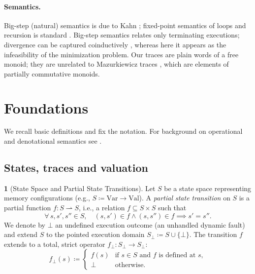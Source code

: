 \documentclass[oneside,english]{amsart}
\numberwithin{equation}{section}
\numberwithin{figure}{section}
\theoremstyle{plain}
\theoremstyle{definition}
\newtheorem{defn}[thm]{\protect\definitionname}
\theoremstyle{plain}
\theoremstyle{remark}
\theoremstyle{plain}
\theoremstyle{definition}
\theoremstyle{plain}
\theoremstyle{remark}
\providecommand{\definitionname}{Definition}
\begin{document}
\paragraph{Semantics.}
Big-step (natural) semantics is due to Kahn \cite{kahn1987natural}; fixed-point semantics of loops and recursion is
standard \cite{manna1974mathematical,winskel1993formal}. Big-step semantics relates only terminating executions; divergence
can be captured coinductively \cite{leroy2009coinductive}, whereas here it appears as the infeasibility of the
minimization problem. Our traces are plain words of a free monoid; they are unrelated to Mazurkiewicz traces
\cite{diekert1995traces}, which are elements of partially commutative monoids.

\section{Foundations}
\label{sec:foundations}

We recall basic definitions and fix the notation. For background on operational and
denotational semantics see \cite{winskel1993formal}.

\subsection{States, traces and valuation}

\begin{defn}[State Space and Partial State Transitions]
\label{def:state-transition}
Let $S$ be a state space representing memory configurations (e.g., $S \coloneqq \text{Var} \to \text{Val}$). A \textit{partial state transition} on $S$ is a partial function $f : S \rightharpoonup S$, i.e., a relation $f \subseteq S \times S$ such that
\[
\forall\, s, s', s'' \in S, \quad (s, s') \in f \land (s, s'') \in f \implies s' = s''.
\]
We denote by $\bot$ an undefined execution outcome (an unhandled dynamic fault) and extend $S$ to the pointed execution domain $S_\bot \coloneqq S \cup \{\bot\}$. The transition $f$ extends to a total, strict operator $f_\bot : S_\bot \to S_\bot$:
\[
f_\bot(s) \coloneqq \begin{cases}
f(s) & \text{if } s \in S \text{ and } f \text{ is defined at } s, \\
\bot & \text{otherwise}.
\end{cases}
\]
\end{defn}
\end{document}
